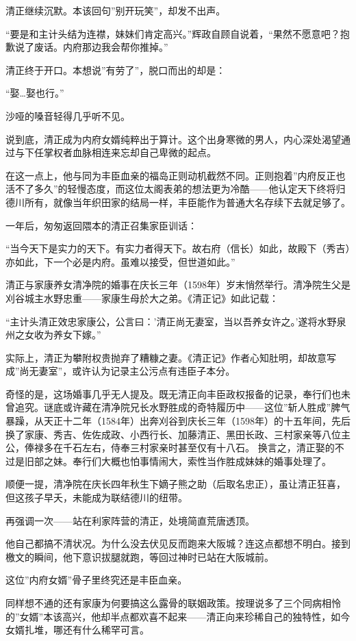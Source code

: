 \documentclass[
]{book}
\begin{document}
清正继续沉默。本该回句''别开玩笑''，却发不出声。

``要是和主计头结为连襟，妹妹们肯定高兴。''辉政自顾自说着，``果然不愿意吧？抱歉说了废话。内府那边我会帮你推掉。''

清正终于开口。本想说''有劳了''，脱口而出的却是：

``娶\ldots 娶也行。''

沙哑的嗓音轻得几乎听不见。

说到底，清正成为内府女婿纯粹出于算计。这个出身寒微的男人，内心深处渴望通过与下任掌权者血脉相连来忘却自己卑微的起点。

在这一点上，他与同为丰臣血亲的福岛正则动机截然不同。正则抱着''内府反正也活不了多久''的轻慢态度，而这位太阁表弟的想法更为冷酷------他认定天下终将归德川所有，就像当年织田家的结局一样，丰臣能作为普通大名存续下去就足够了。

一年后，匆匆返回隈本的清正召集家臣训话：

``当今天下是实力的天下。有实力者得天下。故右府（信长）如此，故殿下（秀吉）亦如此，下一个必是内府。虽难以接受，但世道如此。''

清正与家康养女清净院的婚事在庆长三年（1598年）岁末悄然举行。清净院生父是刈谷城主水野忠重------家康生母於大之弟。《清正记》如此记载：

``主计头清正效忠家康公，公言曰：'清正尚无妻室，当以吾养女许之。'遂将水野泉州之女收为养女下嫁。''

实际上，清正为攀附权贵抛弃了糟糠之妻。《清正记》作者心知肚明，却故意写成''尚无妻室''，或许认为记录主公污点有违臣子本分。

奇怪的是，这场婚事几乎无人提及。既无清正向丰臣政权报备的记录，奉行们也未曾追究。谜底或许藏在清净院兄长水野胜成的奇特履历中------这位''斩人胜成''脾气暴躁，从天正十二年（1584年）出奔刈谷到庆长三年（1598年）的十五年间，先后换了家康、秀吉、佐佐成政、小西行长、加藤清正、黑田长政、三村家亲等八位主公，俸禄多在千石左右，侍奉三村家亲时甚至仅有十八石。 换言之，清正娶的不过是旧部之妹。奉行们大概也怕事情闹大，索性当作胜成妹妹的婚事处理了。

顺便一提，清净院在庆长四年秋生下嫡子熊之助（后取名忠正），虽让清正狂喜，但这孩子早夭，未能成为联结德川的纽带。

再强调一次------站在利家阵营的清正，处境简直荒唐透顶。

他自己都搞不清状况。为什么没去伏见反而跑来大阪城？连这点都想不明白。接到檄文的瞬间，他下意识拔腿就跑，等回过神时已站在大阪城前。

这位''内府女婿''骨子里终究还是丰臣血亲。

同样想不通的还有家康为何要搞这么露骨的联姻政策。按理说多了三个同病相怜的''女婿''本该高兴，他却半点都欢喜不起来------清正向来珍稀自己的独特性，如今女婿扎堆，哪还有什么稀罕可言。
\end{document}
